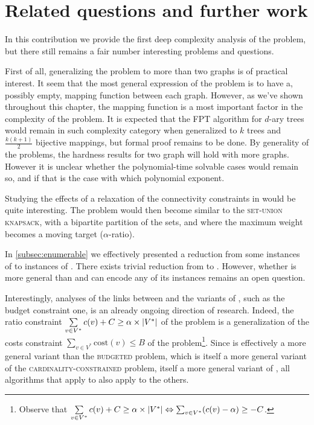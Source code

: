 	\section{Related questions and further work}

		In this contribution we provide the first deep complexity analysis of the \mwccs{} problem, but there still remains a fair number interesting problems and questions.

		First of all, generalizing the problem to more than two graphs is of practical interest.
		It seem that the most general expression of the problem is to have a, possibly empty, mapping function between each graph.
		However, as we've shown throughout this chapter, the mapping function is a most important factor in the complexity of the problem.
		It is expected that the FPT algorithm for $d$-ary trees would remain in such complexity category when generalized to $k$ trees and $\frac{k(k+1)}{2}$ bijective mappings, but formal proof remains to be done.
		By generality of the problems, the hardness results for two graph will hold with more graphs.
		However it is unclear whether the polynomial-time solvable cases would remain so, and if that is the case with which polynomial exponent.

		Studying the effects of a relaxation of the connectivity constraints in \mwccs{} would be quite interesting.
		The problem would then become similar to the \textsc{set-union knapsack}, with a bipartite partition of the sets, and where the maximum weight becomes a moving target ($\alpha$-ratio).

		In \cref{subsec:enumerable} we effectively presented a reduction from some instances of \mwccs{} to instances of \rbmwcs{}.
		There exists trivial reduction from \rbmwcs{} to \mwccs{}.
		However, whether \mwccs{} is more general than \rbmwcs{} and can encode any of its instances remains an open question.

		Interestingly, analyses of the links between \rbmwcs{} and the variants of \mwcs{}, such as the budget constraint one, is an already ongoing direction of research.
		Indeed, the ratio constraint $\sum\limits_{v \in V^*}{c(v)} + C \geq \alpha\times\lvert V^*\rvert$ of the \rbmwcs{} problem is a generalization of the costs constraint $\sum\limits_{v \in V^*}{\text{cost}(v)} \leq B$ of the \bcmwcs{} problem\footnote{Observe that $\sum\limits_{v \in V^*}{c(v)} + C \geq \alpha\times\lvert V^*\rvert \Leftrightarrow \sum_{v \in V^*} (c(v) - \alpha) \geq -C$.}.
		Since \rbmwcs{} is effectively a more general variant than the \textsc{budgeted \mwcs{}} problem, which is itself a more general variant of the \textsc{cardinality-constrained \mwcs{}} problem, itself a more general variant of \mwcs{}, all algorithms that apply to \rbmwcs{} also apply to the others.

